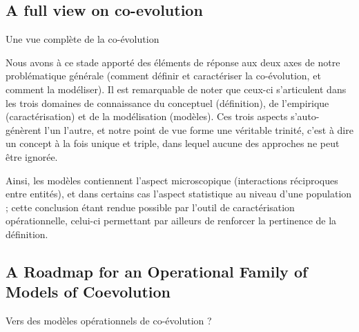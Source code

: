 \subsection*{A full view on co-evolution}{Une vue complète de la co-évolution}


Nous avons à ce stade apporté des éléments de réponse aux deux axes de notre problématique générale (comment définir et caractériser la co-évolution, et comment la modéliser). Il est remarquable de noter que ceux-ci s'articulent dans les trois domaines de connaissance du conceptuel (définition), de l'empirique (caractérisation) et de la modélisation (modèles). Ces trois aspects s'auto-génèrent l'un l'autre, et notre point de vue forme une véritable trinité, c'est à dire un concept à la fois unique et triple, dans lequel aucune des approches ne peut être ignorée.

Ainsi, les modèles contiennent l'aspect microscopique (interactions réciproques entre entités), et dans certains cas l'aspect statistique au niveau d'une population ; cette conclusion étant rendue possible par l'outil de caractérisation opérationnelle, celui-ci permettant par ailleurs de renforcer la pertinence de la définition.



\subsection*{A Roadmap for an Operational Family of Models of Coevolution}{Vers des modèles opérationnels de co-évolution ?}




